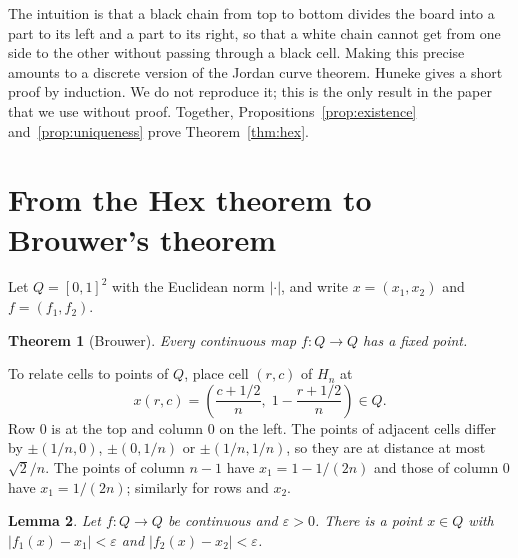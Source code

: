 \documentclass[11pt,a4paper]{amsart}
\newtheorem{theorem}{Theorem}[section]
\newtheorem{lemma}[theorem]{Lemma}
\theoremstyle{definition}
\theoremstyle{remark}
\newcommand{\Q}{Q}
\newcommand{\eps}{\varepsilon}
\begin{document}
The intuition is that a black chain from top to bottom divides the board into a part to its left and a part to its right, so that a white chain cannot get from one side to the other without passing through a black cell. Making this precise amounts to a discrete version of the Jordan curve theorem. Huneke \cite{huneke} gives a short proof by induction. We do not reproduce it; this is the only result in the paper that we use without proof. Together, Propositions~\ref{prop:existence} and~\ref{prop:uniqueness} prove Theorem~\ref{thm:hex}.

\section{From the Hex theorem to Brouwer's theorem}\label{sec:brouwer}

Let $\Q = [0,1]^2$ with the Euclidean norm $|\cdot|$, and write $x = (x_1, x_2)$ and $f = (f_1, f_2)$.

\begin{theorem}[Brouwer]\label{thm:brouwer}
Every continuous map $f \colon \Q \to \Q$ has a fixed point.
\end{theorem}

To relate cells to points of $\Q$, place cell $(r,c)$ of $H_n$ at
\[
  x(r,c) = \left( \frac{c + 1/2}{n},\; 1 - \frac{r + 1/2}{n} \right) \in \Q .
\]
Row $0$ is at the top and column $0$ on the left. The points of adjacent cells differ by $\pm(1/n, 0)$, $\pm(0, 1/n)$ or $\pm(1/n, 1/n)$, so they are at distance at most $\sqrt{2}/n$. The points of column $n-1$ have $x_1 = 1 - 1/(2n)$ and those of column $0$ have $x_1 = 1/(2n)$; similarly for rows and $x_2$.

\begin{lemma}\label{lem:approx}
Let $f \colon \Q \to \Q$ be continuous and $\eps > 0$. There is a point $x \in \Q$ with $|f_1(x) - x_1| < \eps$ and $|f_2(x) - x_2| < \eps$.
\end{lemma}
\end{document}
